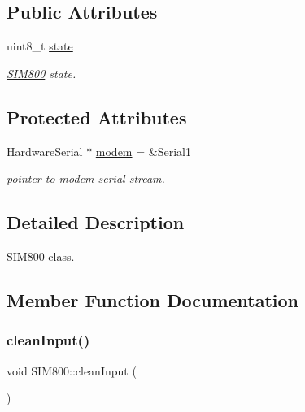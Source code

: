 \subsection*{Public Attributes}
\begin{DoxyCompactItemize}
\item 
\mbox{\label{classSIM800_a825f975081ae033934dca5404895246d}} 
uint8\+\_\+t \hyperlink{classSIM800_a825f975081ae033934dca5404895246d}{state}
\begin{DoxyCompactList}\small\item\em \hyperlink{classSIM800}{S\+I\+M800} state. \end{DoxyCompactList}\end{DoxyCompactItemize}
\subsection*{Protected Attributes}
\begin{DoxyCompactItemize}
\item 
\mbox{\label{classSIM800_ac88d7703f4b6a439c4fb3a97bb0c5d0e}} 
Hardware\+Serial $\ast$ \hyperlink{classSIM800_ac88d7703f4b6a439c4fb3a97bb0c5d0e}{modem} = \&Serial1
\begin{DoxyCompactList}\small\item\em pointer to modem serial stream. \end{DoxyCompactList}\end{DoxyCompactItemize}


\subsection{Detailed Description}
\hyperlink{classSIM800}{S\+I\+M800} class. 

\subsection{Member Function Documentation}
\mbox{\label{classSIM800_ad6ea4550521aee8f55656cede649baff}} 
\subsubsection{\texorpdfstring{clean\+Input()}{cleanInput()}}
{\footnotesize\ttfamily void S\+I\+M800\+::clean\+Input (\begin{DoxyParamCaption}{ }\end{DoxyParamCaption})}



